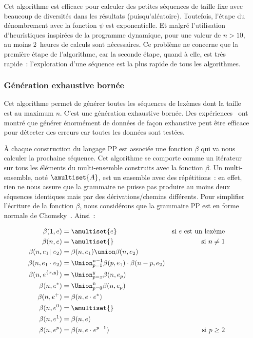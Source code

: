 Cet algorithme est efficace pour calculer des petites séquences de taille fixe
avec beaucoup de diversités dans les résultats (puisqu'aléatoire).  Toutefois,
l'étape du dénombrement avec la fonction $\psi$ est exponentielle. Et malgré
l'utilisation d'heuristiques inspirées de la programme dynamique, pour une
valeur de $n > 10$, au moins 2~heures de calculs sont nécessaires. Ce problème
ne concerne que la première étape de l'algorithme, car la seconde étape, quand à
elle, est très rapide~: l'exploration d'une séquence est la plus rapide de tous
les algorithmes.

\subsubsection{Génération exhaustive bornée}
\label{subsection:data:bounded_exhaustive_generation}

Cet algorithme permet de générer toutes les séquences de lexèmes dont la taille
est au maximum $n$. C'est une génération exhaustive bornée. Des
expériences~ ont montré que générer énormément
de données de façon exhaustive peut être efficace pour détecter des erreurs car
toutes les données sont testées.

À chaque construction du langage PP est associée une fonction $\beta$ qui va
nous calculer la prochaine séquence. Cet algorithme se comporte comme un
itérateur sur tous les éléments du multi-ensemble construits avec la fonction
$\beta$. Un multi-ensemble, noté $\amultiset{A}$, est un ensemble avec des
répétitions~: en effet, rien ne nous assure que la grammaire ne puisse pas
produire au moins deux séquences identiques mais par des dérivations/chemins
différents. Pour simplifier l'écriture de la fonction $\beta$, nous considérons
que la grammaire PP est en forme normale de Chomsky~. Ainsi~:

\begin{align*}
%
\beta(1, e) & =
    \amultiset{e}
    &
    \text{si $e$ est un lexème}
    \\
%
\beta(n, e) & =
    \amultiset{}
    &
    \text{si $n \neq 1$}
    \\
%
\beta(n, e_1 \,\vert\, e_2) & =
    \beta(n, e_1) \union \beta(n, e_2)
    \\
%
\beta(n, e_1 \cdot e_2) & =
    \Union_{p = 1}^{n - 1}
    \beta(p, e_1) \cdot \beta(n - p, e_2)
    \\
%
\beta(n, e^{\{x, y\}}) & =
    \Union_{p = x}^y \beta(n, e_p)
    \\
%
\beta(n, e^*) & =
    \Union_{p = 0}^n \beta(n, e_p)
    \\
%
\beta(n, e^+) & =
    \beta(n, e \cdot e^*)
    \\
%
\beta(n, e^0) & =
    \amultiset{}
    \\
%
\beta(n, e^1) & =
    \beta(n, e)
    \\
%
\beta(n, e^p) & =
    \beta(n, e \cdot e^{p - 1})
    &
    \text{si $p \geq 2$}
%
\end{align*}


